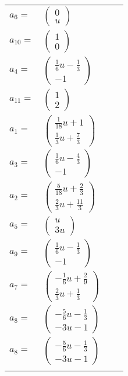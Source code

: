 \documentclass[1p]{elsarticle_modified}
\theoremstyle{definition}
\begin{document}
\begin{tabular}{m{7pt} m{180pt} m{7pt} m{180pt} }
\flushright $a_{6}=$&$\begin{pmatrix}0\\u\end{pmatrix}$ \\
\flushright $a_{10}=$&$\begin{pmatrix}1\\0\end{pmatrix}$ \\
\flushright $a_{4}=$&$\begin{pmatrix}\frac{1}{6} u-\frac{1}{3}\\-1\end{pmatrix}$ \\
\flushright $a_{11}=$&$\begin{pmatrix}1\\2\end{pmatrix}$ \\
\flushright $a_{1}=$&$\begin{pmatrix}\frac{1}{18} u+1\\\frac{1}{3} u+\frac{7}{3}\end{pmatrix}$ \\
\flushright $a_{3}=$&$\begin{pmatrix}\frac{1}{6} u-\frac{4}{3}\\-1\end{pmatrix}$ \\
\flushright $a_{2}=$&$\begin{pmatrix}\frac{5}{18} u+\frac{2}{3}\\\frac{2}{3} u+\frac{11}{3}\end{pmatrix}$ \\
\flushright $a_{5}=$&$\begin{pmatrix}u\\3 u\end{pmatrix}$ \\
\flushright $a_{9}=$&$\begin{pmatrix}\frac{1}{6} u-\frac{1}{3}\\-1\end{pmatrix}$ \\
\flushright $a_{7}=$&$\begin{pmatrix}-\frac{1}{6} u+\frac{2}{9}\\\frac{2}{3} u+\frac{1}{3}\end{pmatrix}$ \\
\flushright $a_{8}=$&$\begin{pmatrix}-\frac{5}{6} u-\frac{1}{3}\\-3 u-1\end{pmatrix}$\\ \flushright $a_{8}=$&$\begin{pmatrix}-\frac{5}{6} u-\frac{1}{3}\\-3 u-1\end{pmatrix}$\\&\end{tabular}
\end{document}

